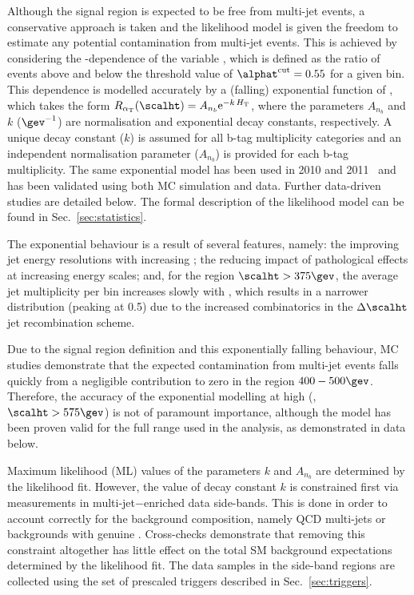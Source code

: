 Although the signal region is expected to be free from multi-jet
events, a conservative approach is taken and the likelihood model is
given the freedom to estimate any potential contamination from
multi-jet events. This is achieved by considering the
\scalht-dependence of the variable \RaT, which is defined as the ratio
of events above and below the threshold value of $\alphat^{\rm
  cut}=0.55$ for a given \scalht bin. This dependence is modelled
accurately by a (falling) exponential function of \scalht, which takes
the form $\RaT(\scalht) = A_{n_b}\mathrm{e}^{-k \, H_\text{T}}$, where
the parameters $A_{n_b}$ and $k$ ($\gev^{-1}$) are normalisation and
exponential decay constants, respectively. A unique decay constant
($k$) is assumed for all b-tag multiplicity categories and an
independent normalisation parameter ($A_{n_b}$) is provided for each
b-tag multiplicity. The same exponential model has been used in 2010
and 2011~\cite{RA1Paper2011,RA1Paper} and has been validated using
both MC simulation and data. Further data-driven studies are detailed
below. The formal description of the likelihood model can be found in
Sec.~\ref{sec:statistics}.

The exponential behaviour is a result of several features, namely: the
improving jet energy resolutions with increasing \scalht; the reducing
impact of pathological effects at increasing energy scales; and, for
the region $\scalht > 375\gev$, the average jet multiplicity per bin
increases slowly with \scalht, which results in a narrower \alphat
distribution (peaking at 0.5) due to the increased combinatorics in
the $\Delta\scalht$ jet recombination scheme. 

Due to the signal region definition and this exponentially falling
behaviour, MC studies demonstrate that the expected contamination from
multi-jet events falls quickly from a negligible contribution to zero
in the region $400-500\gev$. Therefore, the accuracy of the
exponential modelling at high \scalht (\ie, $\scalht > 575\gev$) is
not of paramount importance, although the model has been proven valid
for the full \scalht range used in the analysis, as demonstrated in
data below.

Maximum likelihood (ML) values of the parameters $k$ and $A_{n_b}$ are
determined by the likelihood fit. However, the value of decay constant
$k$ is constrained first via measurements in multi-jet$-$enriched data
side-bands. This is done in order to account correctly for the
background composition, namely QCD multi-jets or backgrounds with
genuine \met. Cross-checks demonstrate that removing this constraint
altogether has little effect on the total SM background expectations
determined by the likelihood fit. The data samples in the side-band
regions are collected using the set of prescaled \httrigger triggers
described in Sec.~\ref{sec:triggers}.

